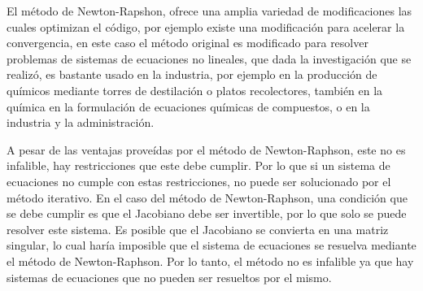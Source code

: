 \documentclass[journal]{IEEEtran}
\begin{document}
El método de Newton-Rapshon, ofrece una amplia variedad de modificaciones las cuales optimizan el código, por ejemplo existe una modificación para acelerar la convergencia, en este caso el método original es modificado para resolver problemas de sistemas de ecuaciones no lineales, que dada la investigación que se realizó, es bastante usado en la industria, por ejemplo en la producción de químicos mediante torres de destilación o platos recolectores, también en la química en la formulación de ecuaciones químicas de compuestos, o en la industria y la administración. 

A pesar de las ventajas proveídas por el método de Newton-Raphson, este no es infalible, hay restricciones que este debe cumplir. Por lo que si un sistema de ecuaciones no cumple con estas restricciones, no puede ser solucionado por el método iterativo. En el caso del método de Newton-Raphson, una condición que se debe cumplir es que el Jacobiano debe ser invertible, por lo que solo se puede resolver este sistema. Es posible que el Jacobiano se convierta en una matriz singular, lo cual haría imposible que el sistema de ecuaciones se resuelva mediante el método de Newton-Raphson. Por lo tanto, el método no es infalible ya que hay sistemas de ecuaciones que no pueden ser resueltos por el mismo.

\end{document}
